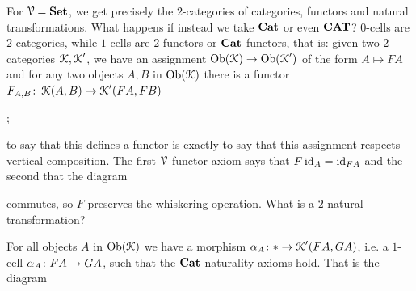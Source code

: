 \documentclass[a4paper,11pt,oneside,openany]{scrbook}
\begin{document}
\begin{exmp}
	For $\operatorname{\mathcal{V}}={\normalfont\textbf{Set}}$, we get precisely the $2$-categories of categories, functors
    and natural transformations. What happens if instead we take ${\normalfont\textbf{Cat}}$ or even ${\normalfont\textbf{CAT}}$?
	$0$-cells are $2$-categories, while $1$-cells are $2$-functors or ${\normalfont\textbf{Cat}}$-functors,
    that is: given two $2$-categories $\operatorname{\mathcal{K}},\operatorname{\mathcal{K}}'$, we have an assignment
	$\operatorname{Ob}(\operatorname{\mathcal{K}}) \to \operatorname{Ob}(\operatorname{\mathcal{K}}')$ of the form $A \mapsto FA$ and for any two objects
    $A,B$ in $\operatorname{Ob}(\operatorname{\mathcal{K}})$ there is a functor $F_{A,B} \colon \operatorname{\mathcal{K}}(A,B) \to \operatorname{\mathcal{K}}'(FA,FB)$
	\begin{center}
		;
	\end{center}
	to say that this defines a functor is exactly to say that this assignment
    respects vertical composition. The first $\operatorname{\mathcal{V}}$-functor axiom says that
    $F\operatorname{id}_{A}=\operatorname{id}_{FA}$
	and the second that the diagram
	\begin{center}
	\end{center}
	commutes, so $F$ preserves the whiskering operation. What is a $2$-natural
    transformation?
	\begin{center}
	\end{center}
	For all objects $A$ in $\operatorname{Ob}(\operatorname{\mathcal{K}})$ we have a morphism $\alpha_{A} \colon \ast \to \operatorname{\mathcal{K}}'(FA,GA)$, i.e. a $1$-cell $\alpha_{A} \colon FA \to GA$, such that
	the ${\normalfont\textbf{Cat}}$-naturality axioms hold. That is the diagram
	\begin{center}
\end{center}
\end{exmp}
\end{document}
